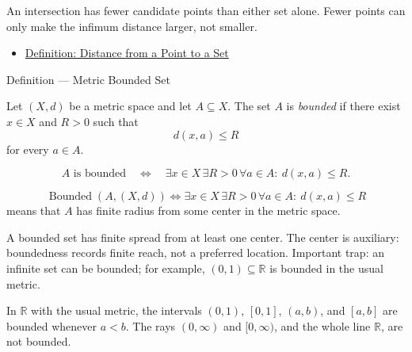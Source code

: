 \begin{remark*}[Interpretation]
An intersection has fewer candidate points than either set alone.  Fewer
points can only make the infimum distance larger, not smaller.
\end{remark*}

\begin{dependencies}
\begin{itemize}
  \item \hyperref[def:metric-point-set-distance]{Definition: Distance from a Point to a Set}
\end{itemize}
\end{dependencies}

\begin{definitionbox}{Definition --- Metric Bounded Set}
\begin{definition}\label{def:metric-bounded-set}
Let \((X,d)\) be a metric space and let \(A\subseteq X\).  The set \(A\) is
\emph{bounded} if there exist \(x\in X\) and \(R>0\) such that
\[
  d(x,a)\leq R
\]
for every \(a\in A\).
\end{definition}
\end{definitionbox}

\begin{remark*}
\[
A\text{ is bounded}
\quad\Longleftrightarrow\quad
\exists x\in X\,\exists R>0\,\forall a\in A{:}\ d(x,a)\leq R.
\]
\end{remark*}

\begin{remark*}
\[
\operatorname{Bounded}(A,(X,d))
\Longleftrightarrow
\exists x\in X\,\exists R>0\,\forall a\in A{:}\ d(x,a)\leq R
\]
means that \(A\) has finite radius from some center in the metric space.
\end{remark*}

\begin{remark*}[Interpretation]
A bounded set has finite spread from at least one center.  The center is
auxiliary: boundedness records finite reach, not a preferred location.
Important trap: an infinite set can be bounded; for example,
\((0,1)\subseteq\mathbb{R}\) is bounded in the usual metric.
\end{remark*}

\begin{remark*}[Examples]
In \(\mathbb{R}\) with the usual metric, the intervals \((0,1)\),
\([0,1]\), \((a,b)\), and \([a,b]\) are bounded whenever \(a<b\).  The rays
\((0,\infty)\) and \([0,\infty)\), and the whole line \(\mathbb{R}\), are not
bounded.
\end{remark*}

